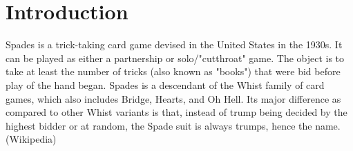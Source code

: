 \section{Introduction}

	Spades is a trick-taking card game devised in the United States in the 1930s. It can be played as either a partnership or solo/"cutthroat" game. The object is to take at least the number of tricks (also known as "books") that were bid before play of the hand began. Spades is a descendant of the Whist family of card games, which also includes Bridge, Hearts, and Oh Hell. Its major difference as compared to other Whist variants is that, instead of trump being decided by the highest bidder or at random, the Spade suit is always trumps, hence the name. (Wikipedia)